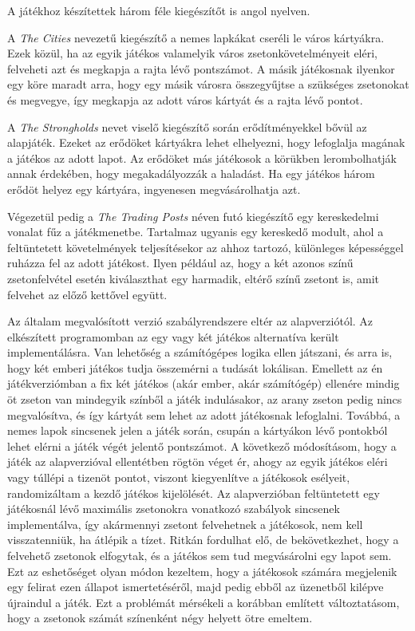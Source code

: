 
A játékhoz készítettek három féle kiegészítőt is angol nyelven.


A \textit{The Cities} nevezetű kiegészítő a nemes lapkákat cseréli le város kártyákra. Ezek közül, ha az egyik játékos valamelyik város zsetonkövetelményeit eléri, felveheti azt és megkapja a rajta lévő pontszámot. A másik játékosnak ilyenkor egy köre maradt arra, hogy egy másik városra összegyűjtse a szükséges zsetonokat és megvegye, így megkapja az adott város kártyát és a rajta lévő pontot.

A \textit{The Strongholds} nevet viselő kiegészítő során erődítményekkel bővül az alapjáték. Ezeket az erődöket kártyákra lehet elhelyezni, hogy lefoglalja magának a játékos az adott lapot. Az erődöket más játékosok a körükben lerombolhatják annak érdekében, hogy megakadályozzák a haladást. Ha egy játékos három erődöt helyez egy kártyára, ingyenesen megvásárolhatja azt.

Végezetül pedig a \textit{The Trading Posts} néven futó kiegészítő egy kereskedelmi vonalat fűz a játékmenetbe. Tartalmaz ugyanis egy kereskedő modult, ahol a feltüntetett követelmények teljesítésekor az ahhoz tartozó, különleges képességgel ruházza fel az adott játékost. Ilyen például az, hogy a két azonos színű zsetonfelvétel esetén kiválaszthat egy harmadik, eltérő színű zsetont is, amit felvehet az előző kettővel együtt.


Az általam megvalósított verzió szabályrendszere eltér az alapverziótól. Az elkészített programomban az egy vagy két játékos alternatíva került implementálásra. Van lehetőség a számítógépes logika ellen játszani, és arra is, hogy két emberi játékos tudja összemérni a tudását lokálisan. Emellett az én játékverziómban a fix két játékos (akár ember, akár számítógép) ellenére mindig öt zseton van mindegyik színből a játék indulásakor, az arany zseton pedig nincs megvalósítva, és így kártyát sem lehet az adott játékosnak lefoglalni. Továbbá, a nemes lapok sincsenek jelen a játék során, csupán a kártyákon lévő pontokból lehet elérni a játék végét jelentő pontszámot. A következő módosításom, hogy a játék az alapverzióval ellentétben rögtön véget ér, ahogy az egyik játékos eléri vagy túllépi a tizenöt pontot, viszont kiegyenlítve a játékosok esélyeit, randomizáltam a kezdő játékos kijelölését. Az alapverzióban feltüntetett egy játékosnál lévő maximális zsetonokra vonatkozó szabályok sincsenek implementálva, így akármennyi zsetont felvehetnek a játékosok, nem kell visszatenniük, ha átlépik a tízet. Ritkán fordulhat elő, de bekövetkezhet, hogy a felvehető zsetonok elfogytak, és a játékos sem tud megvásárolni egy lapot sem. Ezt az eshetőséget olyan módon kezeltem, hogy a játékosok számára megjelenik egy felirat ezen állapot ismertetéséről, majd pedig ebből az üzenetből kilépve újraindul a játék. Ezt a problémát mérsékeli a korábban említett változtatásom, hogy a zsetonok számát színenként négy helyett ötre emeltem. 

